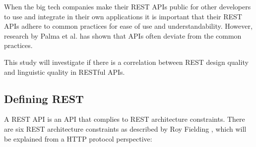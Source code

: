 \documentclass[a4paper,12pt]{article}
\begin{document}
When the big tech companies make their REST APIs public for other developers to use and integrate in their own applications it is important that their REST APIs adhere to common practices for ease of use and understandability. However, research by Palma et al. \cite{linguistic}\cite{design} has shown that APIs often deviate from the common practices. 

This study will investigate if there is a correlation between REST design quality and linguistic quality in RESTful APIs.

\subsection{Defining REST}

A REST API is an API that complies to REST architecture constraints. There are six REST architecture constraints as described by Roy Fielding \cite{restdissertation}, which will be explained from a HTTP protocol perspective:
\end{document}
